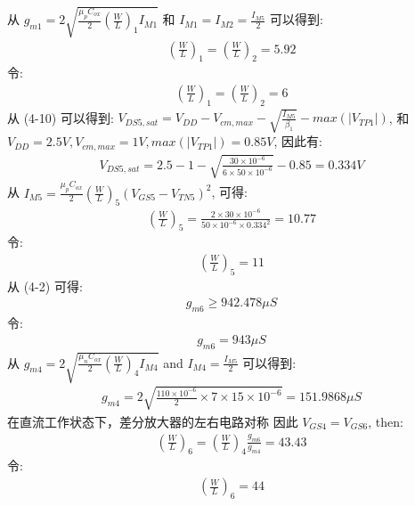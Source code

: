     \indent 从 $ g_{m1} = 2\sqrt{\frac{\mu_pC_{ox}}{2}(\frac{W}{L})_1I_{M1}} $ 和 $ I_{M1} = I_{M2} = \frac{I_{M5}}{2} $ 可以得到:\\
    \begin{align} 
        (\frac{W}{L})_1 = (\frac{W}{L})_2 = 5.92 
    \end{align}
    \indent 令: 
    \begin{align} 
        (\frac{W}{L})_1 = (\frac{W}{L})_2 = 6 
    \end{align}
    \indent 从 (4-10) 可以得到: $ V_{DS5,sat} = V_{DD} - V_{cm,max} - \sqrt{\frac{I_{M5}}{\beta_1}} - max(|V_{TP1}|) $,
    和 $ V_{DD}=2.5V, V_{cm,max} = 1V, max(|V_{TP1}|) = 0.85V $, 因此有: \\
    \begin{align} 
        V_{DS5,sat} = 2.5 - 1 - \sqrt{\frac{30\times 10^{-6}}{6\times 50\times 10^{-6}}} - 0.85 = 0.334V 
    \end{align}
    \indent 从 $ I_{M5} = \frac{\mu_pC_{ox}}{2}(\frac{W}{L})_5(V_{GS5}-V_{TN5})^2 $, 可得: \\
    \begin{align} 
        (\frac{W}{L})_5 = \frac{2\times 30\times 10^{-6}}{50\times 10^{-6}\times0.334^2} = 10.77 
    \end{align}
    \indent 令: 
    \begin{align} 
        (\frac{W}{L})_5 = 11 
    \end{align}
    \indent 从 (4-2) 可得:
    \begin{align} 
        g_{m6} \geq 942.478\mu S 
    \end{align}
    \indent 令: 
    \begin{align} 
        g_{m6} = 943\mu S
    \end{align}
    \indent 从 $ g_{m4} = 2\sqrt{\frac{\mu_nC_{ox}}{2}(\frac{W}{L})_4I_{M4}} $ and $ I_{M4} = \frac{I_{M5}}{2} $ 可以得到:\\
    \begin{align} 
        g_{m4} = 2\sqrt{\frac{110\times 10^{-6}}{2}\times 7\times 15\times 10^{-6}} = 151.9868 \mu S 
    \end{align}
    \indent 在直流工作状态下，差分放大器的左右电路对称 因此 $ V_{GS4} = V_{GS6} $, then: \\
    \begin{align} 
        (\frac{W}{L})_6 = (\frac{W}{L})_4\frac{g_{m6}}{g_{m4}} = 43.43 
    \end{align}
    \indent 令:
    \begin{align} 
        (\frac{W}{L})_6 = 44 
    \end{align}
